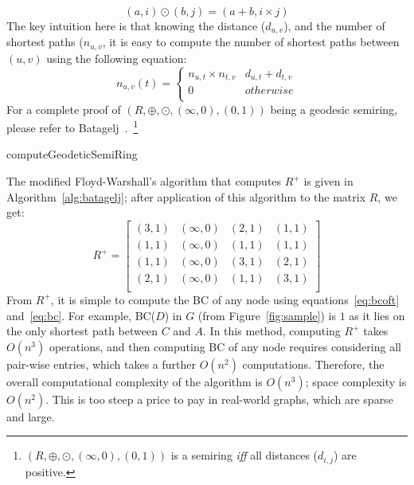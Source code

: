 \begin{equation}
(a,i)\odot{}(b,j) = (a+b, i\times{}j)
\label{eq:odot}
\end{equation}
%
The key intuition here is that knowing the distance ($d_{u,v}$), and the number
of shortest paths ($n_{u,v}$, it is easy to compute the number of shortest
paths between $(u,v)$ using the following equation:
%
\begin{equation}
n_{u,v}(t) = \left\{ \begin{array}{rr} 
  n_{u,t}\times{}n_{t,v} & d_{u,t}+d_{t,v} \\
  0 & otherwise \\
\end{array}\right.
\label{eq:bcoft}
\end{equation}
%
For a complete proof of $(R, \oplus{}, \odot{}, (\infty,0), (0,1))$ being a 
geodesic semiring, please refer to Batagelj~\cite{Batagelj-1994}.~\footnote{
$(R, \oplus{}, \odot{}, (\infty,0), (0,1))$ is a semiring \textit{iff} all 
distances ($d_{i,j}$) are positive.}
%

\begin{algorithm}

\caption{computeGeodeticSemiRing}
\label{alg:batagelj}

\end{algorithm}
%
The modified Floyd-Warshall's algorithm that computes $R^+$ is given in
Algorithm~\ref{alg:batagelj}; after application of this algorithm to the 
matrix $R$, we get:
%
\begin{displaymath}
R^+ = \left[ \begin{array}{cccc}
  (3,1) & (\infty{},0) & (2,1) & (1,1) \\
  (1,1) & (\infty{},0) & (1,1) & (1,1) \\
  (1,1) & (\infty{},0) & (3,1) & (2,1) \\
  (2,1) & (\infty{},0) & (1,1) & (3,1) \\
\end{array} \right]
\end{displaymath}
%
From $R^+$, it is simple to compute the BC of any node using
equations~\ref{eq:bcoft} and~\ref{eq:bc}.
%
For example, BC($D$) in $G$ (from Figure~\ref{fig:sample}) is $1$ as it lies 
on the only shortest path between $C$ and $A$.
%
In this method, computing $R^+$ takes $O(n^3)$ operations, and then computing
BC of any node requires considering all pair-wise entries, which takes a
further $O(n^2)$ computations.
%
Therefore, the overall computational complexity of the algorithm is $O(n^3)$;
space complexity is $O(n^2)$.
%
This is too steep a price to pay in real-world graphs, which are sparse and 
large.

%
%
